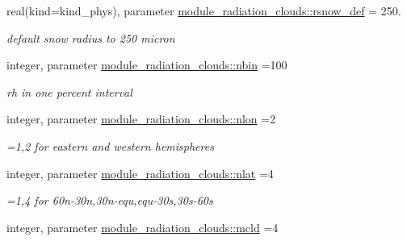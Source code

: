 \begin{DoxyCompactItemize}
\mbox{\label{group__module__radiation__clouds_ga2b68c4a206e17cb59597f6c4dffc7c1a}} 
real(kind=kind\+\_\+phys), parameter \hyperlink{group__module__radiation__clouds_ga2b68c4a206e17cb59597f6c4dffc7c1a}{module\+\_\+radiation\+\_\+clouds\+::rsnow\+\_\+def} = 250.
\begin{DoxyCompactList}\small\item\em default snow radius to 250 micron \end{DoxyCompactList}\item 
\mbox{\label{group__module__radiation__clouds_gad2947b3c0a8382fbe12b76dd68b290e0}} 
integer, parameter \hyperlink{group__module__radiation__clouds_gad2947b3c0a8382fbe12b76dd68b290e0}{module\+\_\+radiation\+\_\+clouds\+::nbin} =100
\begin{DoxyCompactList}\small\item\em rh in one percent interval \end{DoxyCompactList}\item 
\mbox{\label{group__module__radiation__clouds_gab4d14edea12bbcda5361cad523386c7c}} 
integer, parameter \hyperlink{group__module__radiation__clouds_gab4d14edea12bbcda5361cad523386c7c}{module\+\_\+radiation\+\_\+clouds\+::nlon} =2
\begin{DoxyCompactList}\small\item\em =1,2 for eastern and western hemispheres \end{DoxyCompactList}\item 
\mbox{\label{group__module__radiation__clouds_gad4274cb223949e858ecc2e6346bed610}} 
integer, parameter \hyperlink{group__module__radiation__clouds_gad4274cb223949e858ecc2e6346bed610}{module\+\_\+radiation\+\_\+clouds\+::nlat} =4
\begin{DoxyCompactList}\small\item\em =1,4 for 60n-\/30n,30n-\/equ,equ-\/30s,30s-\/60s \end{DoxyCompactList}\item 
\mbox{\label{group__module__radiation__clouds_gafb94f3d62afa49bef6c33f73a7ecad65}} 
integer, parameter \hyperlink{group__module__radiation__clouds_gafb94f3d62afa49bef6c33f73a7ecad65}{module\+\_\+radiation\+\_\+clouds\+::mcld} =4

\end{DoxyCompactItemize}
